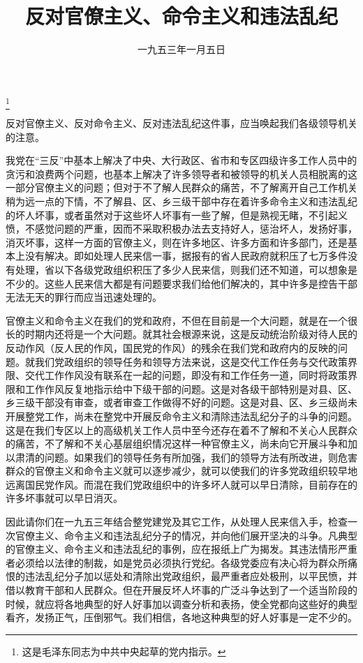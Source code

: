 
\title{反对官僚主义、命令主义和违法乱纪}
\date{一九五三年一月五日}
\thanks{这是毛泽东同志为中共中央起草的党内指示。}
\maketitle


反对官僚主义、反对命令主义、反对违法乱纪这件事，应当唤起我们各级领导机关的注意。

我党在“三反”中基本上解决了中央、大行政区、省市和专区四级许多工作人员中的贪污和浪费两个问题，也基本上解决了许多领导者和被领导的机关人员相脱离的这一部分官僚主义的问题；但对于不了解人民群众的痛苦，不了解离开自己工作机关稍为远一点的下情，不了解县、区、乡三级干部中存在着许多命令主义和违法乱纪的坏人坏事，或者虽然对于这些坏人坏事有一些了解，但是熟视无睹，不引起义愤，不感觉问题的严重，因而不采取积极办法去支持好人，惩治坏人，发扬好事，消灭坏事，这样一方面的官僚主义，则在许多地区、许多方面和许多部门，还是基本上没有解决。即如处理人民来信一事，据报有的省人民政府就积压了七万多件没有处理，省以下各级党政组织积压了多少人民来信，则我们还不知道，可以想象是不少的。这些人民来信大都是有问题要求我们给他们解决的，其中许多是控告干部无法无天的罪行而应当迅速处理的。

官僚主义和命令主义在我们的党和政府，不但在目前是一个大问题，就是在一个很长的时期内还将是一个大问题。就其社会根源来说，这是反动统治阶级对待人民的反动作风（反人民的作风，国民党的作风）的残余在我们党和政府内的反映的问题。就我们党政组织的领导任务和领导方法来说，这是交代工作任务与交代政策界限、交代工作作风没有联系在一起的问题，即没有和工作任务一道，同时将政策界限和工作作风反复地指示给中下级干部的问题。这是对各级干部特别是对县、区、乡三级干部没有审查，或者审查工作做得不好的问题。这是对县、区、乡三级尚未开展整党工作，尚未在整党中开展反命令主义和清除违法乱纪分子的斗争的问题。这是在我们专区以上的高级机关工作人员中至今还存在着不了解和不关心人民群众的痛苦，不了解和不关心基层组织情况这样一种官僚主义，尚未向它开展斗争和加以肃清的问题。如果我们的领导任务有所加强，我们的领导方法有所改进，则危害群众的官僚主义和命令主义就可以逐步减少，就可以使我们的许多党政组织较早地远离国民党作风。而混在我们党政组织中的许多坏人就可以早日清除，目前存在的许多坏事就可以早日消灭。

因此请你们在一九五三年结合整党建党及其它工作，从处理人民来信入手，检查一次官僚主义、命令主义和违法乱纪分子的情况，并向他们展开坚决的斗争。凡典型的官僚主义、命令主义和违法乱纪的事例，应在报纸上广为揭发。其违法情形严重者必须给以法律的制裁，如是党员必须执行党纪。各级党委应有决心将为群众所痛恨的违法乱纪分子加以惩处和清除出党政组织，最严重者应处极刑，以平民愤，并借以教育干部和人民群众。但在开展反坏人坏事的广泛斗争达到了一个适当阶段的时候，就应将各地典型的好人好事加以调查分析和表扬，使全党都向这些好的典型看齐，发扬正气，压倒邪气。我们相信，各地这种典型的好人好事是一定不少的。
